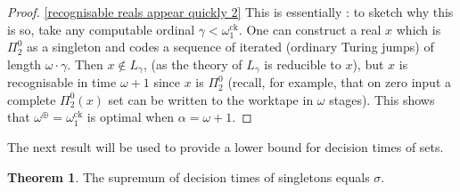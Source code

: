 \documentclass[a4paper,11pt]{amsart}
\theoremstyle{definition}
\newcommand{\ck}{\mathrm{ck}}
\newtheorem{theorem}[fact]{Theorem}
\newtheorem*{problem A}{Problem 1}
\newtheorem*{problem B}{Problem 2}
\theoremstyle{remark}
\begin{document}
\begin{proof}




\ref{recognisable reals appear quickly 2} 
This is essentially \cite[Thm LII]{Rog}: to sketch why this is so, take any computable ordinal $\gamma< \omega^{\ck}_{1}$. 
One can construct a real $x$ which is $\Pi^0_2$ as a singleton and codes a sequence of iterated (ordinary Turing jumps) of length $\omega\cdot \gamma$. 
Then $x \notin L_\gamma$, (as the theory of $L_{\gamma}$ is reducible to $x$), but $x$ is recognisable in time $\omega +1$ since $x$ is $\Pi^0_2$ (recall, for example, that on zero input a complete $\Pi^{0}_{2}(x)$ set can be written to the worktape in $\omega$ stages). 
This shows that $\omega^\oplus=\omega^{\ck}_{1}$ is optimal when $\alpha=\omega +1$. 
\end{proof} 











The next result will be used to provide a lower bound for decision times of sets. 

\begin{theorem}
\label{sigma upper set clockable bound}
The supremum of decision times of singletons equals $\sigma$. 
\end{theorem}
\end{document}
